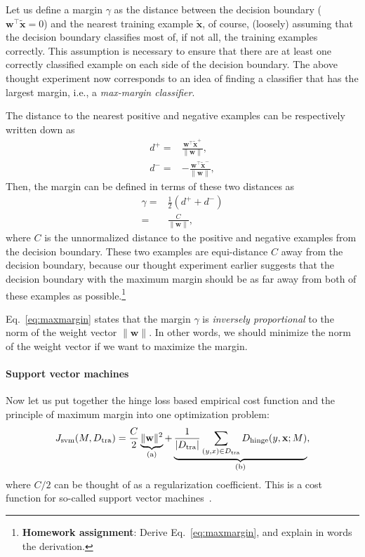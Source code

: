 \documentclass{report}
\newcommand{\vect}[1]{\mathbf{#1}}
\newcommand{\vx}[0]{\vect{x}}
\newcommand{\vw}[0]{\vect{w}}
\newcommand{\hinge}{\text{hinge}}
\newcommand{\tra}{\text{tra}}
\begin{document}
Let us define a margin $\gamma$ as the distance between the decision boundary
($\vw^\top \tilde{\vx} = 0$) and the nearest training example $\tilde{\vx}$, of
course, (loosely) assuming that the decision boundary classifies most of, if not
all, the training examples correctly. This assumption is necessary to ensure
that there are at least one correctly classified example on each side of the
decision boundary.  The above thought experiment now corresponds to an idea of
finding a classifier that has the largest margin, i.e., a {\it max-margin
classifier}. 

The distance to the nearest positive and negative examples can be respectively
written down as 
\begin{align*}
    d^+ =& \frac{\vw^\top \tilde{\vx}^+}{\| \vw \|}, \\
    d^- =& -\frac{\vw^\top \tilde{\vx}^-}{\| \vw \|}, 
\end{align*}
Then, the margin can be defined in terms of these two distances as
\begin{align}
    \label{eq:maxmargin}
    \gamma =& \frac{1}{2} (d^+ + d^-) \\
    =& \frac{C}{\|\vw\|},
\end{align}
where $C$ is the unnormalized distance to the positive and negative examples
from the decision boundary. These two examples are equi-distance $C$ away from
the decision boundary, because our thought experiment earlier suggests that the
decision boundary with the maximum margin should be as far away from both of
these examples as possible.\footnote{
    {\bf Homework assignment}: Derive Eq.~\eqref{eq:maxmargin}, and explain in
    words the derivation. 
}

Eq.~\eqref{eq:maxmargin} states that the margin $\gamma$ is {\it inversely
proportional} to the norm of the weight vector $\| \vw\|$. In other words, we
should minimize the norm of the weight vector if we want to maximize the margin.

\paragraph{Support vector machines}

Now let us put together the hinge loss based empirical cost function and the
principle of maximum margin into one optimization problem:
\begin{align}
    \label{eq:svm}
    J_{\text{svm}}(M,D_{\tra}) = \frac{C}{2}
    \underbrace{\|\vw\|^2}_{\mathclap{\text{(a)}}} + 
    \underbrace{\frac{1}{|D_{\tra}|} \sum_{(y,x)
    \in D_{\tra}} D_{\hinge}(y, \vx; M)}_{
        \mathclap{\text{(b)}}
    },
\end{align}
where $C/2$ can be thought of as a regularization coefficient. This is a cost
function for so-called support vector machines~\cite{cortes1995support}. 
\end{document}
